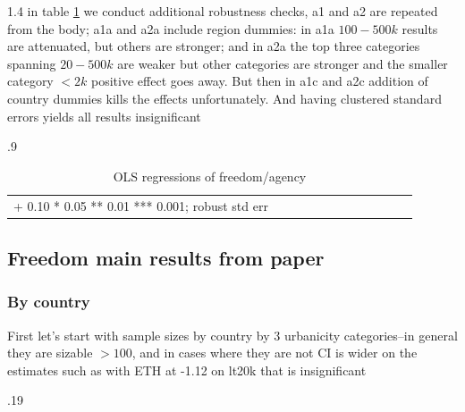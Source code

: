 \documentclass[10pt, letterpaper]{article}
\begin{document}
\begin{spacing}{1.4}
in table \ref{regAA}  we conduct additional robustness checks, a1 and a2 are
repeated from the body; a1a and a2a include region dummies: in a1a  $100-500k$ results are
attenuated, but others are stronger; and in a2a the top three categories
spanning $20-500k$ are weaker but other categories are stronger and the smaller
category $<2k$ positive effect goes away. But then in a1c and a2c addition of
country dummies kills the effects unfortunately. And having clustered standard
errors yields all results insignificant


\begin{spacing}{.9} \begin{table}[H]\centering\begin{scriptsize}
\begin{tabular}{p{.8in}p{.55in}p{.55in}p{.55in}p{.55in}p{.55in}p{.55in}p{.55in}p{.55in}p{.55in}p{.55in}p{.55in}}\hline
\hline + 0.10 * 0.05 ** 0.01 *** 0.001; robust std err
\end{tabular}\end{scriptsize}\caption{\label{regAA}OLS regressions of freedom/agency}
\end{table}\end{spacing}






\subsection{Freedom main results from paper}
\subsubsection{By country}

First let's start with sample sizes by country by 3 urbanicity categories--in
general they are sizable $>100$, and in cases where they are not CI is wider on
the estimates such as with ETH at -1.12 on lt20k that is insignificant

\begin{scriptsize}
\begin{spacing}{.19} 
\begin{verbatim}


\end{verbatim}
\end{spacing}
\end{scriptsize}
\end{spacing}
\end{document}
